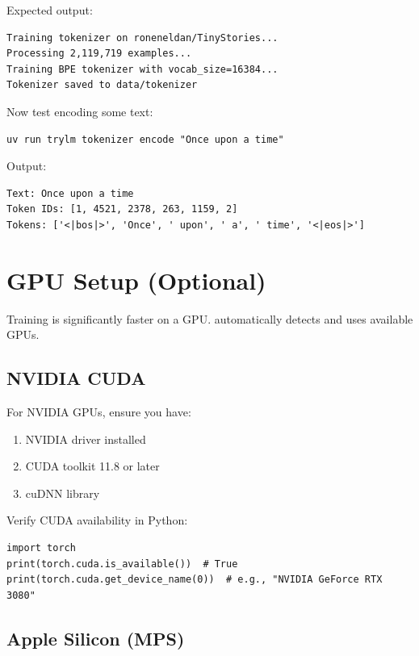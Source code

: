 Expected output:
\begin{lstlisting}[style=shell, numbers=none]
Training tokenizer on roneneldan/TinyStories...
Processing 2,119,719 examples...
Training BPE tokenizer with vocab_size=16384...
Tokenizer saved to data/tokenizer
\end{lstlisting}

Now test encoding some text:

\begin{lstlisting}[style=shell]
uv run trylm tokenizer encode "Once upon a time"
\end{lstlisting}

Output:
\begin{lstlisting}[style=shell, numbers=none]
Text: Once upon a time
Token IDs: [1, 4521, 2378, 263, 1159, 2]
Tokens: ['<|bos|>', 'Once', ' upon', ' a', ' time', '<|eos|>']
\end{lstlisting}

\section{GPU Setup (Optional)}

Training is significantly faster on a GPU. \TryLM automatically detects and uses available GPUs.

\subsection{NVIDIA CUDA}

For NVIDIA GPUs, ensure you have:
\begin{enumerate}
    \item NVIDIA driver installed
    \item CUDA toolkit 11.8 or later
    \item cuDNN library
\end{enumerate}

Verify CUDA availability in Python:

\begin{lstlisting}[style=python]
import torch
print(torch.cuda.is_available())  # True
print(torch.cuda.get_device_name(0))  # e.g., "NVIDIA GeForce RTX 3080"
\end{lstlisting}

\subsection{Apple Silicon (MPS)}

